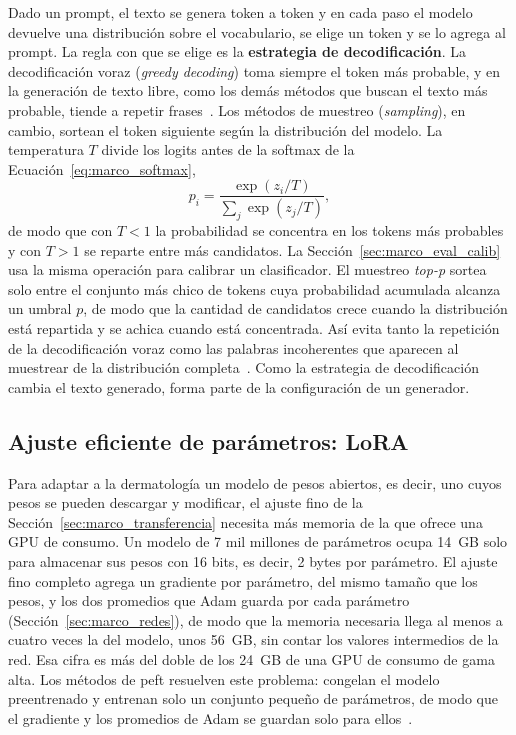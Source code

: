 Dado un prompt, el texto se genera token a token y en cada paso el modelo devuelve una distribución sobre el
vocabulario, se elige un token y se lo agrega al prompt. La regla con que se elige es la \textbf{estrategia de
decodificación}. La decodificación voraz (\emph{greedy decoding}) toma siempre el token más probable, y en la
generación de texto libre, como los demás métodos que buscan el texto más probable, tiende a repetir
frases~\cite{holtzman2020curious}. Los métodos de muestreo (\emph{sampling}), en cambio, sortean el token
siguiente según la distribución del modelo. La temperatura $T$ divide los logits antes de la softmax de la
Ecuación~\ref{eq:marco_softmax},
\begin{equation}
    p_i = \frac{\exp(z_i / T)}{\sum_{j} \exp(z_j / T)},
    \label{eq:marco_temperatura}
\end{equation}
de modo que con $T<1$ la probabilidad se concentra en los tokens más probables y con $T>1$ se reparte entre más
candidatos. La Sección~\ref{sec:marco_eval_calib} usa la misma operación para calibrar un clasificador. El
muestreo \emph{top-p} sortea solo entre el conjunto más chico de tokens cuya probabilidad acumulada alcanza un
umbral $p$, de modo que la cantidad de candidatos crece cuando la distribución está repartida y se achica cuando
está concentrada. Así evita tanto la repetición de la decodificación voraz como las palabras incoherentes que
aparecen al muestrear de la distribución completa~\cite{holtzman2020curious}. Como la estrategia de
decodificación cambia el texto generado, forma parte de la configuración de un generador.

\subsection{Ajuste eficiente de parámetros: LoRA}
\label{sec:marco_llm_lora}

Para adaptar a la dermatología un modelo de pesos abiertos, es decir, uno cuyos pesos se pueden descargar y
modificar, el ajuste fino de la Sección~\ref{sec:marco_transferencia} necesita más memoria de la que ofrece una
GPU de consumo. Un modelo de 7 mil millones de parámetros ocupa 14~GB solo para almacenar sus pesos con 16 bits, es decir, 2 bytes por parámetro. El ajuste
fino completo agrega un gradiente por parámetro, del mismo tamaño que los pesos, y los dos promedios que Adam
guarda por cada parámetro (Sección~\ref{sec:marco_redes}), de modo que la memoria necesaria llega al menos a
cuatro veces la del modelo, unos 56~GB, sin contar los valores intermedios de la red. Esa cifra es más del
doble de los 24~GB de una GPU de consumo de gama alta. Los métodos de \gls{peft} resuelven este problema:
congelan el modelo preentrenado y entrenan solo un conjunto pequeño de parámetros, de modo que el gradiente y
los promedios de Adam se guardan solo para ellos~\cite{hu2021lora}.

